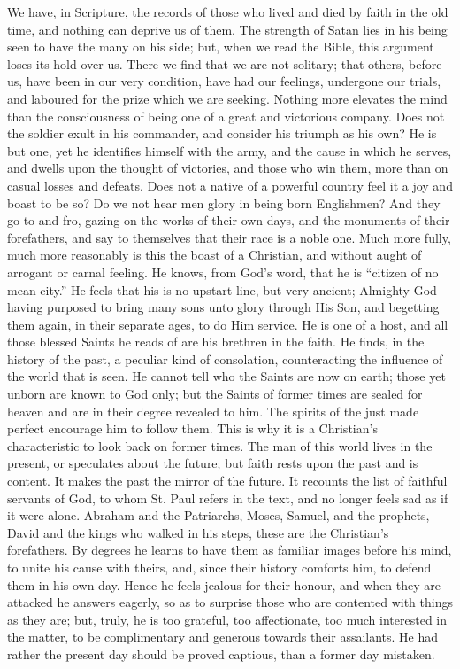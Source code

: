We have, in Scripture, the records of those who lived and died by
faith in the old time, and nothing can deprive us of them. The
strength of Satan lies in his being seen to have the many on his side;
but, when we read the Bible, this argument loses its hold over us.
There we find that we are not solitary; that others, before us, have
been in our very condition, have had our feelings, undergone our
trials, and laboured for the prize which we are seeking. Nothing more
elevates the mind than the consciousness of being one of a great and
victorious company. Does not the soldier exult in his commander, and
consider his triumph as his own? He is but one, yet he identifies
himself with the army, and the cause in which he serves, and dwells
upon the thought of victories, and those who win them, more than on
casual losses and defeats. Does not a native of a powerful country
feel it a joy and boast to be so? Do we not hear men glory in being
born Englishmen? And they go to and fro, gazing on the works of their
own days, and the monuments of their forefathers, and say to
themselves that their race is a noble one. Much more fully, much more
reasonably is this the boast of a Christian, and without aught of
arrogant or carnal feeling. He knows, from God's word, that he is
``citizen of no mean city.'' He feels that his is no upstart
line, but very ancient; Almighty God having purposed to bring many
sons unto glory through His Son, and begetting them again, in their
separate ages, to do Him service. He is one of a host, and all those
blessed Saints he reads of are his brethren in the faith. He finds, in
the history of the past, a peculiar kind of consolation, counteracting
the influence of the world that is seen. He cannot tell who the Saints
are now on earth; those yet unborn are known to God only; but the
Saints of former times are sealed for heaven and are in their degree
revealed to him. The spirits of the just made perfect encourage him to
follow them. This is why it is a Christian's characteristic to look
back on former times. The man of this world lives in the present, or
speculates about the future; but faith rests upon the past and is
content. It makes the past the mirror of the future. It recounts the
list of faithful servants of God, to whom St. Paul refers in the text,
and no longer feels sad as if it were alone. Abraham and the
Patriarchs, Moses, Samuel, and the prophets, David and the kings who
walked in his steps, these are the Christian's forefathers. By
degrees he learns to have them as familiar images before his mind, to
unite his cause with theirs, and, since their history comforts him, to
defend them in his own day. Hence he feels jealous for their honour,
and when they are attacked he answers eagerly, so as to surprise those
who are contented with things as they are; but, truly, he is too
grateful, too affectionate, too much interested in the matter, to be
complimentary and generous towards their assailants. He had rather the
present day should be proved captious, than a former day mistaken.

